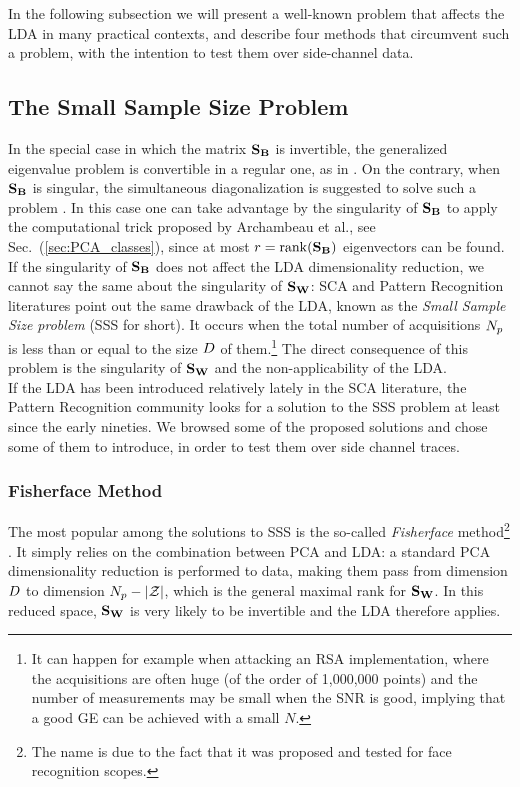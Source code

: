 In the following subsection we will present a well-known problem that affects the LDA in many practical contexts, and describe four methods that circumvent such a problem, with the intention to test them over side-channel data.


\subsection{The Small Sample Size Problem}\label{sec:SSS}
In the special case in which the matrix $\textbf{S}_{\textbf{B}}$ is invertible, the generalized eigenvalue problem is convertible in a regular one, as in \cite{Standaert2008}. On the contrary, when $\textbf{S}_{\textbf{B}}$ is singular, the simultaneous diagonalization is suggested to solve such a problem \cite{Fukunaga}. In this case one can take advantage by the singularity of $\textbf{S}_{\textbf{B}}$ to apply the computational trick proposed by Archambeau et al., see Sec.~(\ref{sec:PCA_classes}), since at most $r = \mathrm{rank}(\textbf{S}_{\textbf{B}})$ eigenvectors can be found.\\

If the singularity of $\textbf{S}_{\textbf{B}}$ does not affect the LDA dimensionality reduction, we cannot say the same about the singularity of $\textbf{S}_{\textbf{W}}$:  SCA and Pattern Recognition literatures point out the same drawback of the LDA, known as the {\em Small Sample Size problem} (SSS for short). It occurs when the total number of acquisitions $N_p$ is less than or equal to the size $D$ of them.\footnote{It can happen for example when attacking an RSA implementation, where the acquisitions are often huge (of the order of 1,000,000 points) and the number of measurements may be small when the SNR is good, implying that a good GE can be achieved with a small $N$.} The direct consequence of this problem is the singularity of $\textbf{S}_{\textbf{W}}$ and the non-applicability of the LDA. \\

If the LDA has been introduced relatively lately in the SCA literature, the Pattern Recognition community looks for a solution to the SSS problem at least since the early nineties. We browsed some of the proposed solutions and chose some of them to introduce, in order to test them over side channel traces.

\subsubsection{Fisherface Method}
The most popular among the solutions to SSS is the so-called {\em Fisherface} method\footnote{The name is due to the fact that it was proposed and tested for face recognition scopes.} \cite{eigenfaces}. It simply relies on the combination between PCA and LDA: a standard PCA dimensionality reduction is performed to data, making them pass from dimension $D$ to dimension $N_p-\lvert\mathcal{Z}\rvert$, which is the general maximal rank for $\textbf{S}_{\textbf{W}}$. In this reduced space, $\textbf{S}_{\textbf{W}}$ is very likely to be invertible and the LDA therefore applies.


